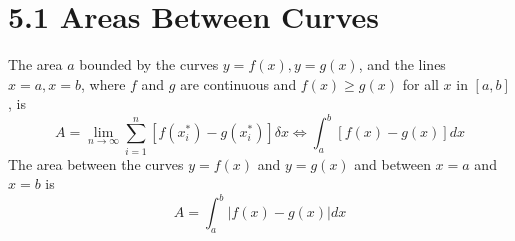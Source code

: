 %
%

\section*{5.1 Areas Between Curves}

The area \(a\) bounded by the curves \(y=f(x), y=g(x)\), and the lines \(x=a, x=b\), where \(f\) and \(g\) are continuous and \(f(x) \geq g(x)\) for all \(x\) in \([a, b]\), is 
\[ A = \lim_{n \to \infty} \sum_{i=1}^n[f(x_i^*)-g(x_i^*)]\delta x \Leftrightarrow \int_a^b[f(x)-g(x)]dx \] 
The area between the curves \(y=f(x)\) and \(y=g(x)\) and between \(x=a\) and \(x=b\) is 
\[ A = \int_a^b \left | f(x)-g(x) \right | dx \]

